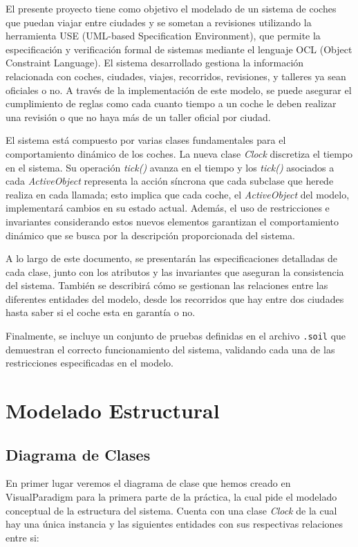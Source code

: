 \documentclass[12pt.a4paper]{article}
\begin{document}
El presente proyecto tiene como objetivo el modelado de un sistema de coches que puedan viajar entre ciudades y se sometan a revisiones utilizando la herramienta USE (UML-based Specification Environment), que permite la especificación y verificación formal de sistemas mediante el lenguaje OCL (Object Constraint Language). El sistema desarrollado gestiona la información relacionada con coches, ciudades, viajes, recorridos, revisiones, y talleres ya sean oficiales o no. A través de la implementación de este modelo, se puede asegurar el cumplimiento de reglas como cada cuanto tiempo a un coche le deben realizar una revisión o que no haya más de un taller oficial por ciudad.
\vspace{0.5cm} 

El sistema está compuesto por varias clases fundamentales para el comportamiento dinámico de los coches. La nueva clase \emph{Clock} discretiza el tiempo en el sistema. Su operación \emph{tick()} avanza en el tiempo y los \emph{tick()} asociados a cada \emph{ActiveObject} representa la acción síncrona que cada subclase que herede realiza en cada llamada; esto implica que cada coche, el \emph{ActiveObject} del modelo, implementará cambios en su estado actual. Además, el uso de restricciones e invariantes considerando estos nuevos elementos garantizan el comportamiento dinámico que se  busca por la descripción proporcionada del sistema.
\vspace{0.5cm} 

A lo largo de este documento, se presentarán las especificaciones detalladas de cada clase, junto con los atributos y las invariantes que aseguran la consistencia del sistema. También se describirá cómo se gestionan las relaciones entre las diferentes entidades del modelo, desde los recorridos que hay entre dos ciudades hasta saber si el coche esta en garantía o no.
\vspace{0.5cm} 


Finalmente, se incluye un conjunto de pruebas definidas en el archivo \texttt{.soil} que demuestran el correcto funcionamiento del sistema, validando cada una de las restricciones especificadas en el modelo.
\vspace{1.0cm} 


\newpage

\section{Modelado Estructural}
\subsection{Diagrama de Clases}
En primer lugar veremos el diagrama de clase que hemos creado en VisualParadigm para la primera parte de la práctica, la cual pide el modelado conceptual de la estructura del sistema. Cuenta con una clase \emph{Clock} de la cual hay una única instancia y las siguientes entidades con sus respectivas relaciones entre si:
\end{document}
